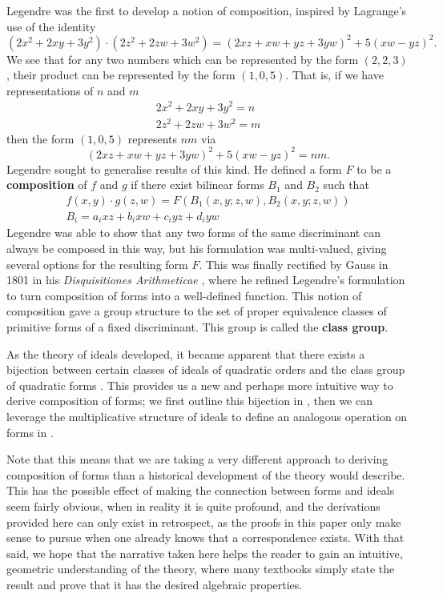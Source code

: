 \documentclass[honours,12pt]{unswthesis}
\numberwithin{equation}{section}
\begin{document}
\vspace{2mm}
\noindent
Legendre was the first to develop a notion of composition, inspired by Lagrange's use of the identity
$$(2x^2 + 2xy + 3y^2) \cdot (2z^2 + 2zw + 3w^2) = (2xz + xw + yz + 3yw)^2 + 5(xw - yz)^2.$$
We see that for any two numbers which can be represented by the form $(2, 2, 3)$, their product can be represented by the form $(1, 0, 5)$.
That is, if we have representations of $n$ and $m$
\begin{gather*}
    2x^2 + 2xy + 3y^2 = n \\
    2z^2 + 2zw + 3w^2 = m
\end{gather*}
then the form $(1, 0, 5)$ represents $nm$ via
$$(2xz + xw + yz + 3yw)^2 + 5(xw - yz)^2 = nm.$$
Legendre sought to generalise results of this kind.
He defined a form $F$ to be a \textbf{composition} of $f$ and $g$ if there exist bilinear forms $B_1$ and $B_2$ such that
\begin{gather*}
    f(x, y) \cdot g(z, w) = F(B_1(x, y; z, w), B_2(x, y; z, w)) \\
    B_i = a_i xz + b_i xw + c_i yz + d_i yw
\end{gather*}
Legendre was able to show that any two forms of the same discriminant can always be composed in this way, but his formulation was multi-valued, giving several options for the resulting form $F$.
This was finally rectified by Gauss in 1801 in his \emph{Disquisitiones Arithmeticae} \cite{gauss}, where he refined Legendre's formulation to turn composition of forms into a well-defined function.
This notion of composition gave a group structure to the set of proper equivalence classes of primitive forms of a fixed discriminant.
This group is called the \textbf{class group}.

As the theory of ideals developed, it became apparent that there exists a bijection between certain classes of ideals of quadratic orders and the class group of quadratic forms \cite[Ch.\,1]{buell}.
This provides us a new and perhaps more intuitive way to derive composition of forms;
we first outline this bijection in , then we can leverage the multiplicative structure of ideals to define an analogous operation on forms in .

Note that this means that we are taking a very different approach to deriving composition of forms than a historical development of the theory would describe.
This has the possible effect of making the connection between forms and ideals seem fairly obvious, when in reality it is quite profound, and the derivations provided here can only exist in retrospect, as the proofs in this paper only make sense to pursue when one already knows that a correspondence exists.
With that said, we hope that the narrative taken here helps the reader to gain an intuitive, geometric understanding of the theory, where many textbooks simply state the result and prove that it has the desired algebraic properties.
\end{document}
